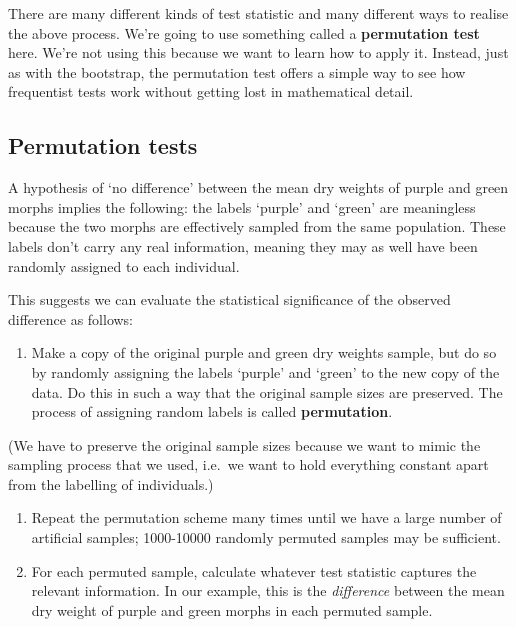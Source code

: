 \documentclass[
]{book}
\providecommand{\tightlist}{%
  \setlength{\itemsep}{0pt}\setlength{\parskip}{0pt}}
\begin{document}
There are many different kinds of test statistic and many different ways to realise the above process. We're going to use something called a \textbf{permutation test} here. We're not using this because we want to learn how to apply it. Instead, just as with the bootstrap, the permutation test offers a simple way to see how frequentist tests work without getting lost in mathematical detail.

\hypertarget{permutation-tests}{%
\subsection{Permutation tests}\label{permutation-tests}}

A hypothesis of `no difference' between the mean dry weights of purple and green morphs implies the following: the labels `purple' and `green' are meaningless because the two morphs are effectively sampled from the same population. These labels don't carry any real information, meaning they may as well have been randomly assigned to each individual.

This suggests we can evaluate the statistical significance of the observed difference as follows:

\begin{enumerate}
\def\labelenumi{\arabic{enumi}.}
\tightlist
\item
  Make a copy of the original purple and green dry weights sample, but do so by randomly assigning the labels `purple' and `green' to the new copy of the data. Do this in such a way that the original sample sizes are preserved. The process of assigning random labels is called \textbf{permutation}.
\end{enumerate}

(We have to preserve the original sample sizes because we want to mimic the sampling process that we used, i.e.~we want to hold everything constant apart from the labelling of individuals.)

\begin{enumerate}
\def\labelenumi{\arabic{enumi}.}
\setcounter{enumi}{1}
\item
  Repeat the permutation scheme many times until we have a large number of artificial samples; 1000-10000 randomly permuted samples may be sufficient.
\item
  For each permuted sample, calculate whatever test statistic captures the relevant information. In our example, this is the \emph{difference} between the mean dry weight of purple and green morphs in each permuted sample.
\end{enumerate}
\end{document}
